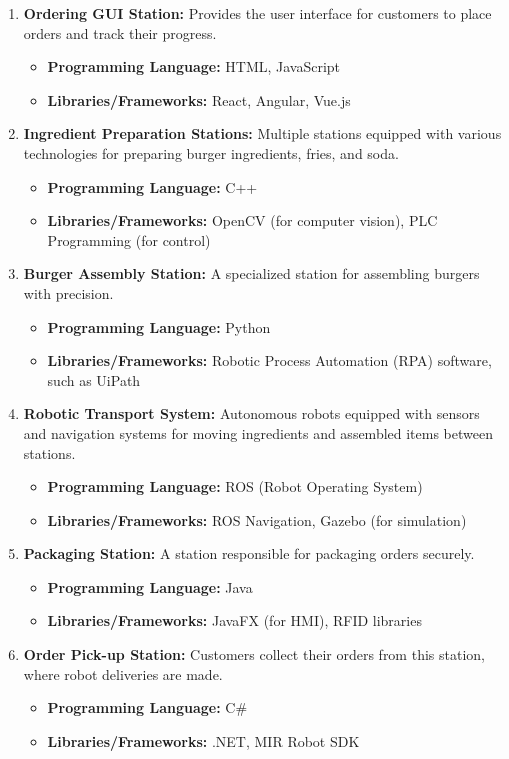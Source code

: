\documentclass[conference]{IEEEtran}
\begin{document}
\begin{enumerate}
    \item \textbf{Ordering GUI Station:} Provides the user interface for customers to place orders and track their progress.
        \begin{itemize}
            \item \textbf{Programming Language:} HTML, JavaScript
            \item \textbf{Libraries/Frameworks:} React, Angular, Vue.js
        \end{itemize}
    \item \textbf{Ingredient Preparation Stations:} Multiple stations equipped with various technologies for preparing burger ingredients, fries, and soda.
        \begin{itemize}
            \item \textbf{Programming Language:} C++
            \item \textbf{Libraries/Frameworks:} OpenCV (for computer vision), PLC Programming (for control)
        \end{itemize}
    \item \textbf{Burger Assembly Station:} A specialized station for assembling burgers with precision.
        \begin{itemize}
            \item \textbf{Programming Language:} Python
            \item \textbf{Libraries/Frameworks:} Robotic Process Automation (RPA) software, such as UiPath
        \end{itemize}
    \item \textbf{Robotic Transport System:} Autonomous robots equipped with sensors and navigation systems for moving ingredients and assembled items between stations.
        \begin{itemize}
            \item \textbf{Programming Language:} ROS (Robot Operating System)
            \item \textbf{Libraries/Frameworks:} ROS Navigation, Gazebo (for simulation)
        \end{itemize}
    \item \textbf{Packaging Station:} A station responsible for packaging orders securely.
        \begin{itemize}
            \item \textbf{Programming Language:} Java
            \item \textbf{Libraries/Frameworks:} JavaFX (for HMI), RFID libraries
        \end{itemize}
    \item \textbf{Order Pick-up Station:} Customers collect their orders from this station, where robot deliveries are made.
        \begin{itemize}
            \item \textbf{Programming Language:} C#
            \item \textbf{Libraries/Frameworks:} .NET, MIR Robot SDK
        \end{itemize}
\end{enumerate}
\end{document}
